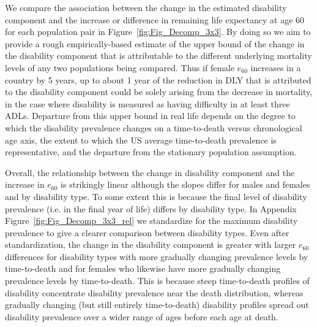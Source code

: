 \documentclass[11pt,oneside,a4paper]{article} %
\begin{document}
We compare the association between the change in the estimated disability
component and the increase or difference in remaining life expectancy at age 60 for each population pair in
Figure~\ref{fig:Fig_Decomp_3x3}. By doing so we aim to provide a rough
empirically-based estimate of the upper bound of the change in the disability
component that is attributable to the different underlying mortality levels
of any two populations being compared. Thus if female $e_{60}$ increases in a
country by 5 years, up to about 1 year of the reduction in DLY that is
attributed to the disability component could be solely arising from the decrease
in mortality, in the case where disability is measured as having difficulty in
at least three ADLs. Departure from this upper bound in real life depends on
the degree to which the disability prevalence changes on a time-to-death versus chronological
age axis, the extent to which the US average time-to-death prevalence is
representative, and the departure from the stationary population assumption.

Overall, the relationship between the change in disability component and the
increase in $e_{60}$ is strikingly linear although the slopes differ for males
and females and by disability type. To some extent this is because the
final level of disability prevalence (i.e. in the final year of life) differs by
disability type.
In Appendix Figure~\ref{fig:Fig_Decomp_3x3_rel} we standardize for the maximum
disability prevalence to give a clearer comparison between disability types.
Even after standardization, the change in the disability component is
greater with larger $e_{60}$ differences for disability types with more
gradually changing prevalence levels by time-to-death and for females who
likewise have more gradually changing prevalence levels by time-to-death.
This is because steep time-to-death profiles of disability concentrate
disability prevalence near the death distribution,
whereas gradually changing (but still entirely time-to-death) disability
profiles spread out disability prevalence over a wider range of ages before
each age at death.
\end{document}
